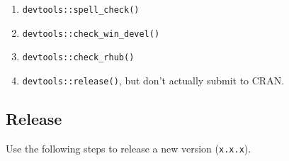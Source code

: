 \documentclass{article}
\begin{document}
\begin{enumerate}
\begin{enumerate}
	  \item \verb+devtools::spell_check()+

	  \item \verb+devtools::check_win_devel()+

	  \item \verb+devtools::check_rhub()+

	  \item \verb+devtools::release()+, 
            but don't actually submit to CRAN.
            
	\end{enumerate}


\end{enumerate}


\subsection{Release} 
\label{sec:release}

Use the following steps to release a new version (\texttt{x.x.x}).
\end{document}
